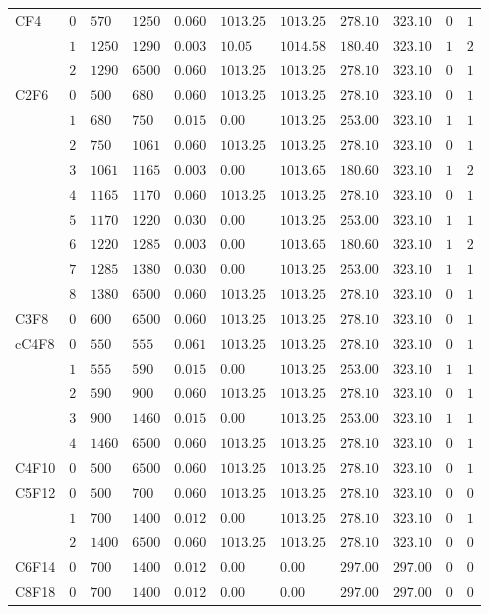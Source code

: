 \begin{table}
\begin{tabular}{lllllllllll}
CF4 & $0$ & $570$ & $1250$ & $0.060$ & $1013.25$ & $1013.25$ & $278.10$ & $323.10$ & $0$ & $1$\tabularnewline
& $1$ & $1250$ & $1290$ & $0.003$ & $10.05$ & $1014.58$ & $180.40$ & $323.10$ & $1$ & $2$\tabularnewline
& $2$ & $1290$ & $6500$ & $0.060$ & $1013.25$ & $1013.25$ & $278.10$ & $323.10$ & $0$ & $1$\tabularnewline
C2F6 & $0$ & $500$ & $680$ & $0.060$ & $1013.25$ & $1013.25$ & $278.10$ & $323.10$ & $0$ & $1$\tabularnewline
& $1$ & $680$ & $750$ & $0.015$ & $0.00$ & $1013.25$ & $253.00$ & $323.10$ & $1$ & $1$\tabularnewline
& $2$ & $750$ & $1061$ & $0.060$ & $1013.25$ & $1013.25$ & $278.10$ & $323.10$ & $0$ & $1$\tabularnewline
& $3$ & $1061$ & $1165$ & $0.003$ & $0.00$ & $1013.65$ & $180.60$ & $323.10$ & $1$ & $2$\tabularnewline
& $4$ & $1165$ & $1170$ & $0.060$ & $1013.25$ & $1013.25$ & $278.10$ & $323.10$ & $0$ & $1$\tabularnewline
& $5$ & $1170$ & $1220$ & $0.030$ & $0.00$ & $1013.25$ & $253.00$ & $323.10$ & $1$ & $1$\tabularnewline
& $6$ & $1220$ & $1285$ & $0.003$ & $0.00$ & $1013.65$ & $180.60$ & $323.10$ & $1$ & $2$\tabularnewline
& $7$ & $1285$ & $1380$ & $0.030$ & $0.00$ & $1013.25$ & $253.00$ & $323.10$ & $1$ & $1$\tabularnewline
& $8$ & $1380$ & $6500$ & $0.060$ & $1013.25$ & $1013.25$ & $278.10$ & $323.10$ & $0$ & $1$\tabularnewline
C3F8 & $0$ & $600$ & $6500$ & $0.060$ & $1013.25$ & $1013.25$ & $278.10$ & $323.10$ & $0$ & $1$\tabularnewline
cC4F8 & $0$ & $550$ & $555$ & $0.061$ & $1013.25$ & $1013.25$ & $278.10$ & $323.10$ & $0$ & $1$\tabularnewline
& $1$ & $555$ & $590$ & $0.015$ & $0.00$ & $1013.25$ & $253.00$ & $323.10$ & $1$ & $1$\tabularnewline
& $2$ & $590$ & $900$ & $0.060$ & $1013.25$ & $1013.25$ & $278.10$ & $323.10$ & $0$ & $1$\tabularnewline
& $3$ & $900$ & $1460$ & $0.015$ & $0.00$ & $1013.25$ & $253.00$ & $323.10$ & $1$ & $1$\tabularnewline
& $4$ & $1460$ & $6500$ & $0.060$ & $1013.25$ & $1013.25$ & $278.10$ & $323.10$ & $0$ & $1$\tabularnewline
C4F10 & $0$ & $500$ & $6500$ & $0.060$ & $1013.25$ & $1013.25$ & $278.10$ & $323.10$ & $0$ & $1$\tabularnewline
C5F12 & $0$ & $500$ & $700$ & $0.060$ & $1013.25$ & $1013.25$ & $278.10$ & $323.10$ & $0$ & $0$\tabularnewline
& $1$ & $700$ & $1400$ & $0.012$ & $0.00$ & $1013.25$ & $278.10$ & $323.10$ & $0$ & $1$\tabularnewline
& $2$ & $1400$ & $6500$ & $0.060$ & $1013.25$ & $1013.25$ & $278.10$ & $323.10$ & $0$ & $0$\tabularnewline
C6F14 & $0$ & $700$ & $1400$ & $0.012$ & $0.00$ & $0.00$ & $297.00$ & $297.00$ & $0$ & $0$\tabularnewline
C8F18 & $0$ & $700$ & $1400$ & $0.012$ & $0.00$ & $0.00$ & $297.00$ & $297.00$ & $0$ & $0$\tabularnewline
\hline 
\end{tabular}
\end{table}

